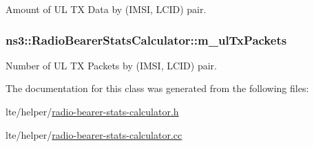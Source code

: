 Amount of UL TX Data by (I\+M\+SI, L\+C\+ID) pair. 

\subsubsection[{\texorpdfstring{m\+\_\+ul\+Tx\+Packets}{m_ulTxPackets}}]{ ns3\+::\+Radio\+Bearer\+Stats\+Calculator\+::m\+\_\+ul\+Tx\+Packets\hspace{0.3cm}{\ttfamily [private]}}\hypertarget{classns3_1_1RadioBearerStatsCalculator_a00874c8bd4409c6bbdbccc6be27058ee}{}\label{classns3_1_1RadioBearerStatsCalculator_a00874c8bd4409c6bbdbccc6be27058ee}


Number of UL TX Packets by (I\+M\+SI, L\+C\+ID) pair. 



The documentation for this class was generated from the following files\+:\begin{DoxyCompactItemize}
\item 
lte/helper/\hyperlink{radio-bearer-stats-calculator_8h}{radio-\/bearer-\/stats-\/calculator.\+h}\item 
lte/helper/\hyperlink{radio-bearer-stats-calculator_8cc}{radio-\/bearer-\/stats-\/calculator.\+cc}\end{DoxyCompactItemize}
